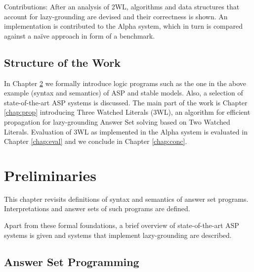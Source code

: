 \documentclass{vutinfth} %
\begin{document}


Contributions: After an analysis of 2WL, algorithms and data structures that account for lazy-grounding are devised and their correctness is shown. An implementation is contributed to the Alpha system, which in turn is compared against a na{\"i}ve approach in form of a benchmark.

\section{Structure of the Work}

In Chapter \ref{chap:prelim} we formally introduce logic programs such as the one in the above example (syntax and semantics) of ASP and stable models. Also, a selection of state-of-the-art ASP systems is discussed. The main part of the work is Chapter \ref{chap:prop} introducing Three Watched Literals (3WL), an algorithm for efficient propagation for lazy-grounding Answer Set solving based on Two Watched Literals. Evaluation of 3WL as implemented in the Alpha system is evaluated in Chapter \ref{chap:eval} and we conclude in Chapter \ref{chap:conc}.

\chapter{Preliminaries}
\label{chap:prelim}

This chapter revisits definitions of syntax and semantics of answer set programs. Interpretations and answer sets of such programs are defined.

Apart from these formal foundations, a brief overview of state-of-the-art ASP systems is given and systems that implement lazy-grounding are described.

\section{Answer Set Programming}
\end{document}
